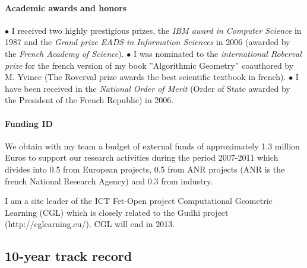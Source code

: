 \paragraph{Academic awards and honors}\mbox{}

$\bullet$ I received two highly prestigious prizes, the {\em IBM award in Computer Science}  in 1987
and the {\em Grand prize EADS in Information Sciences} in 2006 (awarded by the {\em French Academy of Science}).  $\bullet$  I was nominated to the {\em international Roberval prize} for the french version of my book ”Algorithmic Geometry” coauthored by M. Yvinec (The Roverval prize awards the best scientific textbook in french). $\bullet$  I have been received in the {\em National Order of Merit} (Order of State awarded by the President of the French Republic)  in 2006.

\paragraph{Funding ID} \mbox{}



We obtain with my team a budget of external funds of approximately 1.3 million Euros to support our research activities during the period 2007-2011 which divides into 0.5 from European projects,
0.5 from ANR projects (ANR is the french National Research Agency) and 0.3 from industry.

I am a site leader of the ICT Fet-Open project Computational Geometric Learning (CGL) which is closely related to the Gudhi project (http://cglearning.eu/). CGL will end in 2013. 

\newpage

\subsection{10-year track record}

